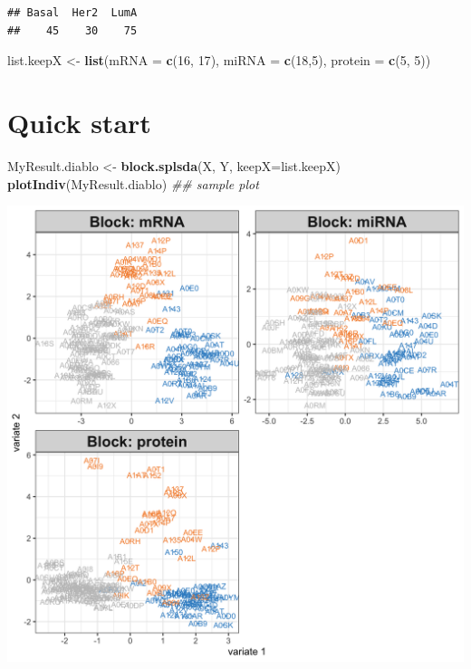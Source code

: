 \documentclass[]{book}
\newenvironment{Shaded}{\begin{snugshade}}{\end{snugshade}}
\newcommand{\CommentTok}[1]{\textcolor[rgb]{0.56,0.35,0.01}{\textit{#1}}}
\newcommand{\DataTypeTok}[1]{\textcolor[rgb]{0.13,0.29,0.53}{#1}}
\newcommand{\DecValTok}[1]{\textcolor[rgb]{0.00,0.00,0.81}{#1}}
\newcommand{\KeywordTok}[1]{\textcolor[rgb]{0.13,0.29,0.53}{\textbf{#1}}}
\newcommand{\NormalTok}[1]{#1}
\newcommand{\StringTok}[1]{\textcolor[rgb]{0.31,0.60,0.02}{#1}}
\begin{document}
\begin{verbatim}
## Basal  Her2  LumA 
##    45    30    75
\end{verbatim}

\begin{Shaded}
\begin{Highlighting}[]
\NormalTok{list.keepX <-}\StringTok{ }\KeywordTok{list}\NormalTok{(}\DataTypeTok{mRNA =} \KeywordTok{c}\NormalTok{(}\DecValTok{16}\NormalTok{, }\DecValTok{17}\NormalTok{), }\DataTypeTok{miRNA =} \KeywordTok{c}\NormalTok{(}\DecValTok{18}\NormalTok{,}\DecValTok{5}\NormalTok{), }\DataTypeTok{protein =} \KeywordTok{c}\NormalTok{(}\DecValTok{5}\NormalTok{, }\DecValTok{5}\NormalTok{))}
\end{Highlighting}
\end{Shaded}

\hypertarget{quick-start-3}{%
\section{Quick start}\label{quick-start-3}}

\begin{Shaded}
\begin{Highlighting}[]
\NormalTok{MyResult.diablo <-}\StringTok{ }\KeywordTok{block.splsda}\NormalTok{(X, Y, }\DataTypeTok{keepX=}\NormalTok{list.keepX)}
\KeywordTok{plotIndiv}\NormalTok{(MyResult.diablo) }\CommentTok{## sample plot}
\end{Highlighting}
\end{Shaded}

\begin{center}\includegraphics[width=0.75\linewidth,]{Figures/06-diablo-sparse-1} \end{center}
\end{document}
